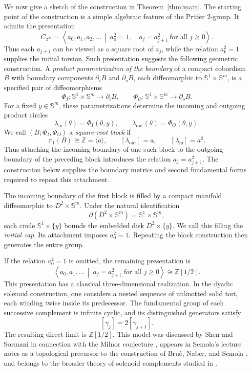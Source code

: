 \documentclass[11pt,reqno]{amsart}
\theoremstyle{definition}
\numberwithin{equation}{section}
\newcommand{\CPrufer}{C_{2^\infty}}
\begin{document}
We now give a sketch of the construction in Theorem~\ref{thm:main}. The starting point of the construction is a simple algebraic feature of
the Pr\"ufer $2$-group.  It admits the presentation
\[
 \CPrufer
 =
 \left\langle
 a_0,a_1,a_2,\ldots
 \ \middle|\
 a_0^2=1,\quad a_j=a_{j+1}^2\ \text{for all }j\ge0
 \right\rangle.
\]
Thus each $a_{j+1}$ can be viewed as a square root of $a_j$, while the
relation $a_0^2=1$ supplies the initial torsion.  Such presentation
suggests the following geometric construction.  A \emph{product parametrization of the boundary} of a compact cobordism $B$ with boundary components
$\partial_iB$ and $\partial_oB$, each diffeomorphic to
$\mathbb S^1\times\mathbb S^m$, is a specified pair of diffeomorphisms
\[
 \Phi_I:\mathbb S^1\times\mathbb S^m\longrightarrow\partial_iB,
 \qquad
 \Phi_O:\mathbb S^1\times\mathbb S^m\longrightarrow\partial_oB.
\]
For a fixed $y\in\mathbb S^m$, these parametrizations  determine the
incoming and outgoing product circles
\[
 \lambda_{\mathrm{in}}(\theta)=\Phi_I(\theta,y),
 \qquad
 \lambda_{\mathrm{out}}(\theta)=\Phi_O(\theta,y).
\]
We call $(B;\Phi_I,\Phi_O)$ a \emph{square-root block} if
\begin{equation}\label{def:square-root-block}
 \pi_1(B)\cong\mathbb Z=\langle a\rangle,
 \qquad
 [\lambda_{\mathrm{out}}]=a,
 \qquad
 [\lambda_{\mathrm{in}}]=a^2.
\end{equation}
Thus attaching the incoming boundary of one such block to the outgoing
boundary of the preceding block introduces the relation
$a_j=a_{j+1}^2$.  The construction below supplies the boundary metrics
and second fundamental forms required to repeat this attachment.

The incoming boundary of the first block is filled by a compact
manifold diffeomorphic to \(D^2\times\mathbb S^m\).  Under the natural
identification
\[
 \partial(D^2\times\mathbb S^m)
 =\mathbb S^1\times\mathbb S^m,
\]
each circle \(\mathbb S^1\times\{y\}\) bounds the embedded disk
\(D^2\times\{y\}\).  We call this filling the \emph{initial cap}. Its
attachment imposes $a_0^2=1$.  Repeating the block construction then
generates the entire group.

If the relation $a_0^2=1$ is omitted, the remaining presentation is
\[
 \left\langle a_0,a_1,\ldots
 \ \middle|\
 a_j=a_{j+1}^2\ \text{for all }j\ge0
 \right\rangle
 \cong\mathbb Z[1/2].
\]
This presentation has a classical three-dimensional realization.
In the dyadic solenoid
construction, one considers a nested sequence of unknotted solid tori,
each winding twice inside its predecessor.  The fundamental group of
each successive complement is infinite cyclic, and its distinguished
generators satisfy
\[
 [\gamma_j]=2[\gamma_{j+1}].
\]
The resulting direct limit is $\mathbb Z[1/2]$.  This model was discussed
by Shen and Sormani in connection with the Milnor conjecture
\cite{ShenSormani2006}, appears in Semola's lecture notes as a
topological precursor to the construction of Bru\`e, Naber, and Semola
\cite{SemolaNotes2025}, and belongs to the broader theory of solenoid
complements studied in \cite{ConnerMeilstrupRepovs2015}.
\end{document}
